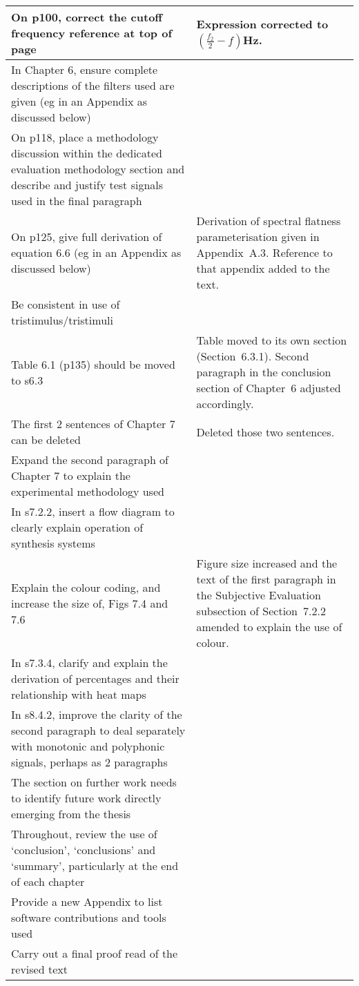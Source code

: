 \documentclass[a4paper]{article}
\begin{document}
\begin{center}
\begin{longtable}{|C{8.5cm}|C{8.5cm}|}
		\hline
		On p100, correct the cutoff frequency reference at top of page & Expression corrected to
			$\left( \frac{f_{2}}{2} - f \right)$Hz. \tabularnewline
		\hline
		In Chapter 6, ensure complete descriptions of the filters used are given (eg in an Appendix as discussed
			below) & \tabularnewline
		\hline
		On p118, place a methodology discussion within the dedicated evaluation methodology section and describe and
			justify test signals used in the final paragraph & \tabularnewline
		\hline
		On p125, give full derivation of equation 6.6 (eg in an Appendix as discussed below) &
			Derivation of spectral flatness parameterisation given in Appendix~A.3. Reference to that appendix
			added to the text. \tabularnewline
		\hline
		Be consistent in use of tristimulus/tristimuli & \tabularnewline
		\hline
		Table 6.1 (p135) should be moved to s6.3 & Table moved to its own section (Section~6.3.1).
			Second paragraph in the conclusion section of Chapter~6 adjusted accordingly. \tabularnewline
		\hline
		The first 2 sentences of Chapter 7 can be deleted & Deleted those two sentences. \tabularnewline
		\hline
		Expand the second paragraph of Chapter 7 to explain the experimental methodology used & \tabularnewline
		\hline
		In s7.2.2, insert a flow diagram to clearly explain operation of synthesis systems & \tabularnewline
		\hline
		Explain the colour coding, and increase the size of, Figs 7.4 and 7.6 & Figure size increased
			and the text of the first paragraph in the Subjective Evaluation subsection of Section~7.2.2
			amended to explain the use of colour. \tabularnewline
		\hline
		In s7.3.4, clarify and explain the derivation of percentages and their relationship with heat maps &
			\tabularnewline
		\hline
		In s8.4.2, improve the clarity of the second paragraph to deal separately with monotonic and polyphonic
			signals, perhaps as 2 paragraphs & \tabularnewline
		\hline
		The section on further work needs to identify future work directly emerging from the thesis &
			\tabularnewline
		\hline
		Throughout, review the use of `conclusion', `conclusions' and `summary', particularly at the end of each
			chapter & \tabularnewline
		\hline
		Provide a new Appendix to list software contributions and tools used & \tabularnewline
		\hline
		Carry out a final proof read of the revised text & \tabularnewline
		\hline
	\end{longtable}
\end{center}
\end{document}
